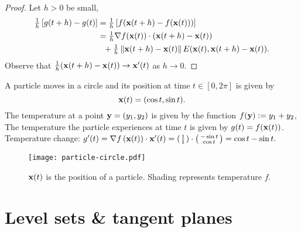\begin{proof}
    Let \(h>0\) be small, \vspace{-.5em}
    \[
        \begin{aligned}
            \tfrac{1}{h}\left[g(t+h)-g(t) \right]
             & = \tfrac{1}{h}\left[f(\mathbf{x}(t+h)-f(\mathbf{x}(t)))\right]                        \\
             & = \tfrac{1}{h} \nabla f(\mathbf{x}(t))\cdot (\mathbf{x}(t+h)-\mathbf{x}(t))                  \\
             & \ \ +  \tfrac{1}{h}  \left\|\mathbf{x}(t+h)-\mathbf{x}(t)\right\| E(\mathbf{x}(t), \mathbf{x}(t+h)-\mathbf{x}(t)).
        \end{aligned}
    \]
    Observe that \(\tfrac{1}{h}  (\mathbf{x}(t+h)-\mathbf{x}(t)) \to \mathbf{x}'(t)  \) as \(h\to 0\).
\end{proof}


\begin{example*}
    A particle moves in a circle and its position at time \(t\in [0,2\pi]\) is given by
    \[
        \mathbf{x}(t) = (\cos t, \sin t).
    \]
    The temperature at a point \(\mathbf{y}=(y_1,y_2)\) is given by the function \(f(\mathbf{y}) := y_1 + y_2\),
    The temperature the particle experiences at time \(t\) is given by \(g(t) = f (\mathbf{x}(t))\).
    Temperature change:
    \(
    g'(t)
    = \nabla f \left(\mathbf{x}(t)\right) \cdot \mathbf{x}'(t)
    = \left(\begin{smallmatrix}
            1 \\
            1
        \end{smallmatrix}\right)
    \cdot
    \left( \begin{smallmatrix}
            -\sin t \\
            \cos t
        \end{smallmatrix}\right)
    = \cos t - \sin t.
    \)
\end{example*}

\begin{figure}
    \begin{center}
        \texttt{[image: particle-circle.pdf]}
        \caption{\(\mathbf{x}(t)\) is the position of a particle. Shading represents temperature \(f\).}%
        \label{fig:particle-circle}
    \end{center}
\end{figure}


\section{Level sets \& tangent planes}

